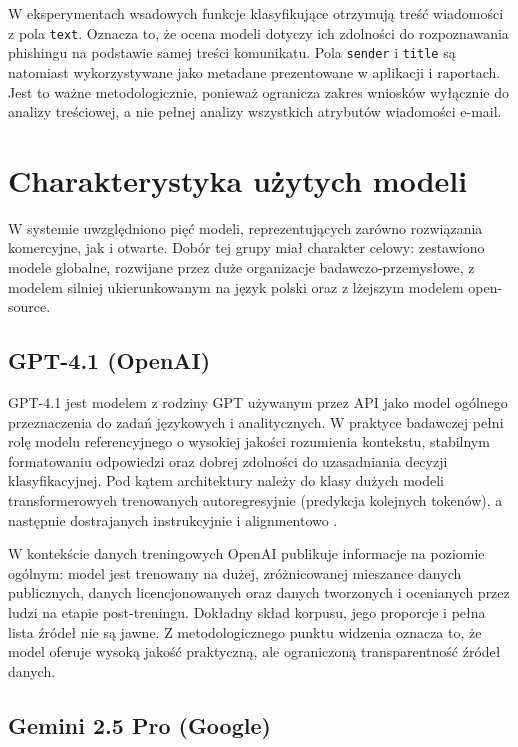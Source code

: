 \documentclass[12pt,a4paper,openright]{report}
\begin{document}
W eksperymentach wsadowych funkcje klasyfikujące otrzymują treść wiadomości z pola \texttt{text}. Oznacza to, że ocena modeli dotyczy ich zdolności do rozpoznawania phishingu na podstawie samej treści komunikatu. Pola \texttt{sender} i \texttt{title} są natomiast wykorzystywane jako metadane prezentowane w aplikacji i raportach. Jest to ważne metodologicznie, ponieważ ogranicza zakres wniosków wyłącznie do analizy treściowej, a nie pełnej analizy wszystkich atrybutów wiadomości e-mail.

\section{Charakterystyka użytych modeli}

W systemie uwzględniono pięć modeli, reprezentujących zarówno rozwiązania komercyjne, jak i otwarte. Dobór tej grupy miał charakter celowy: zestawiono modele globalne, rozwijane przez duże organizacje badawczo-przemysłowe, z modelem silniej ukierunkowanym na język polski oraz z lżejszym modelem open-source.

\subsection{GPT-4.1 (OpenAI)}

GPT-4.1 jest modelem z rodziny GPT używanym przez API jako model ogólnego przeznaczenia do zadań językowych i analitycznych. W praktyce badawczej pełni rolę modelu referencyjnego o wysokiej jakości rozumienia kontekstu, stabilnym formatowaniu odpowiedzi oraz dobrej zdolności do uzasadniania decyzji klasyfikacyjnej. Pod kątem architektury należy do klasy dużych modeli transformerowych trenowanych autoregresyjnie (predykcja kolejnych tokenów), a następnie dostrajanych instrukcyjnie i alignmentowo \cite{openai2024gpt4}.

W kontekście danych treningowych OpenAI publikuje informacje na poziomie ogólnym: model jest trenowany na dużej, zróżnicowanej mieszance danych publicznych, danych licencjonowanych oraz danych tworzonych i ocenianych przez ludzi na etapie post-treningu. Dokładny skład korpusu, jego proporcje i pełna lista źródeł nie są jawne. Z metodologicznego punktu widzenia oznacza to, że model oferuje wysoką jakość praktyczną, ale ograniczoną transparentność źródeł danych.

\subsection{Gemini 2.5 Pro (Google)}
\end{document}
